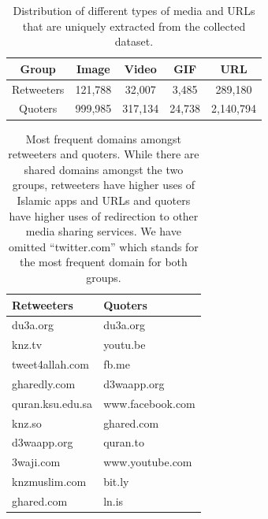 \documentclass[letterpaper]{article}
\begin{document}
\begin{table}[!htbp]
\centering
\begin{tabular}{|c||c|c|c|c|}
 \hline
 Group & Image & Video & GIF & URL \\ [0.5ex]
 \hline\hline
  \rule{0pt}{1ex} Retweeters & 121,788 & 32,007 & 3,485 & 289,180 \\\hline
 Quoters & 999,985 & 317,134 & 24,738 & 2,140,794 \\[0.25ex]\hline
\end{tabular}
\caption{Distribution of different types of media and URLs that are uniquely extracted from the collected dataset.}
\label{table:media-types}
\end{table}


\begin{table}[!h]
\centering
\begin{tabular}{|l||l|}
 \hline
 Retweeters & Quoters \\ [0.5ex]
 \hline\hline
  du3a.org & du3a.org\\
  knz.tv & youtu.be\\
  tweet4allah.com & fb.me\\
  gharedly.com & d3waapp.org\\
  quran.ksu.edu.sa & www.facebook.com\\
  knz.so & ghared.com\\
  d3waapp.org & quran.to\\
  3waji.com & www.youtube.com\\
  knzmuslim.com & bit.ly\\
  ghared.com & ln.is\\
  [0.25ex]\hline
\end{tabular}
\caption{Most frequent domains amongst retweeters and quoters. While there are shared domains amongst the two groups, retweeters have higher uses of Islamic apps and URLs and quoters have higher uses of redirection to other media sharing services. We have omitted ``twitter.com'' which stands for the most frequent domain for both groups.}
\label{table:urls}
\end{table}
\end{document}
